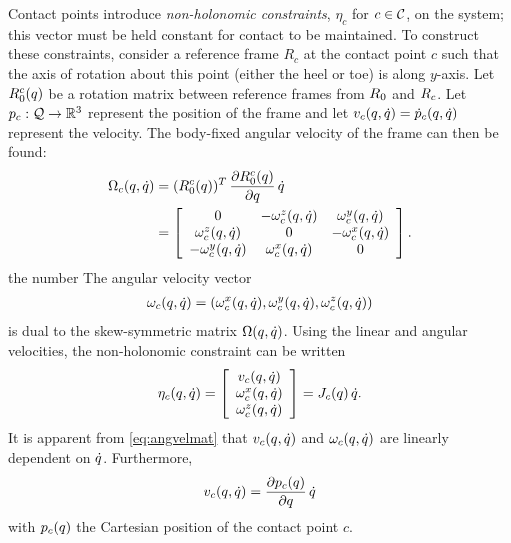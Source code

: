 Contact points introduce {\em non-holonomic constraints}, $\eta_{c}$ for $c \in
\mathcal{C}$, on the system; this vector must be held constant for contact to be
maintained.
%
To construct these constraints, consider a reference frame $R_{c}$ at the
contact point $c$ such that the axis of rotation about this point (either the
heel or toe) is along $y$-axis.
%
Let $R_{0}^{c}(q)$ be a rotation matrix between reference frames from
$R_{0}$ and $R_{c}$.
%
Let $p_{c} : \mathcal{Q} \to \mathbb{R}^{3}$ represent the position of the frame and let
$v_{c}(q, \dot{q}) = {\dot p}_{c}(q, \dot{q})$ represent the velocity.
%
The body-fixed angular velocity of the frame can then be found:
%
\begin{align}
  \label{eq:angvelmat}
  \Omega_{c}(q, \dot{q}) &= (R_{0}^{c}(q))^{T} \, \frac{\partial{R_{0}^{c}(q)}}{\partial{q}}
  \, \dot{q}\\
  \nonumber
  &= \left[\begin{array}{c c c}
      0 & -\omega_{c}^{z}(q, \dot{q}) & \omega_{c}^{y}(q, \dot{q})\\
      \omega_{c}^{z}(q, \dot{q}) & 0 & -\omega_{c}^{x}(q, \dot{q})\\
      -\omega_{c}^{y}(q, \dot{q}) & \omega_{c}^{x}(q, \dot{q}) & 0
    \end{array}\right].
\end{align}the number
%
The angular velocity vector
\begin{align*}
  \omega_{c}(q, \dot{q}) = (\omega_{c}^{x}(q, \dot{q}), \omega_{c}^{y}(q, \dot{q}), \omega_{c}^{z}(q, \dot{q}))
\end{align*}
is dual to the skew-symmetric matrix $\Omega(q, \dot{q})$.
%
Using the linear and angular velocities, the non-holonomic constraint can be written
\begin{align*}
  \eta_{c}(q, \dot{q}) = \left[\begin{array}{c}
      v_{c}(q, \dot{q})\\
      \omega_{c}^{x}(q, \dot{q})\\
      \omega_{c}^{z}(q, \dot{q})
    \end{array}\right] =
  J_{c}(q) \, \dot{q}.
\end{align*}
It is apparent from \eqref{eq:angvelmat} that $v_{c}(q, \dot{q})$ and
$\omega_{c}(q, \dot{q})$ are linearly dependent on $\dot{q}$.
%
Furthermore,
\begin{align*}
  v_{c}(q, \dot{q}) = \frac{\partial{p_{c}(q)}}{\partial{q}} \, \dot{q}
\end{align*}
with $p_{c}(q)$ the Cartesian position of the contact point $c$.
%
